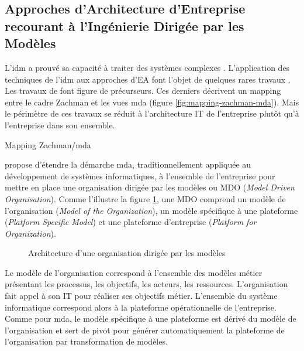 \subsection{Approches d'Architecture d'Entreprise \\
recourant à l'Ingénierie Dirigée par les Modèles}
\label{sec:ea_with_idm}

L'\gls{idm} a prouvé sa capacité à traiter des systèmes complexes \cite{france2007model}. L'application des techniques de l'\gls{idm} aux approches d'EA font l'objet de quelques rares travaux \cite{bruneliere2013support}. Les travaux de \cite{frankel2003zachman} font figure de précurseurs. Ces derniers décrivent un mapping entre le cadre Zachman et les vues \gls{mda} (figure \ref{fig:mapping-zachman-mda}). Mais le périmètre de ces travaux se réduit à l'architecture IT de l'entreprise plutôt qu'à l'entreprise dans son ensemble.

\begin{table}[!ht]
    \vspace*{0.5em}
    \makebox[\linewidth][l]{%
      \hspace{3mm}%
    }
    \caption{Mapping Zachman/\gls{mda} \protect\cite{frankel2003zachman}}
    \label{fig:mapping-zachman-mda}
\end{table}

\cite{clark_towards_2014} propose d'étendre la démarche \gls{mda},  traditionnellement appliquée au développement de systèmes informatiques, à l'ensemble de l'entreprise pour mettre en place une organisation dirigée par les modèles ou MDO (\textit{Model Driven Organisation}). Comme l'illustre la figure \ref{fig:mdo}, une MDO comprend un modèle de l'organisation (\textit{Model of the Organization}), un modèle spécifique à une plateforme (\textit{Platform Specific Model}) et une plateforme d'entreprise (\textit{Platform for Organization}). 

\begin{figure}[!ht]
    \begin{center}
        
    \end{center}
    \caption{Architecture d'une organisation dirigée par les modèles\protect\cite{clark_towards_2014}}
    \label{fig:mdo}
\end{figure}

Le modèle de l'organisation correspond à l'ensemble des modèles métier présentant les processus, les objectifs, les acteurs, les ressources. L'organisation fait appel à son IT pour réaliser ses objectifs métier. L'ensemble du système informatique correspond alors à la plateforme opérationnelle de l'entreprise. Comme pour \gls{mda}, le modèle spécifique à une plateforme est dérivé du modèle de l'organisation et sert de pivot pour générer automatiquement la plateforme de l'organisation par transformation de modèles.

